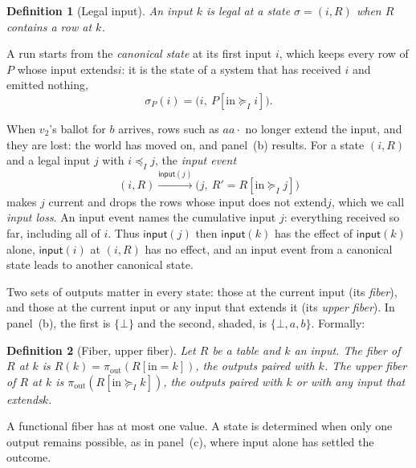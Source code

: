 \documentclass[sigconf]{cidr-2027}
\newtheorem{definition}{Definition}
\theoremstyle{remark}
\newcommand{\InputOrd}{\preceq_I}
\newcommand{\InputGe}{\succeq_I}
\newcommand{\inrel}{extends\xspace}          %
\newcommand{\inrelbase}{extend\xspace}       %
\begin{document}
\begin{definition}[Legal input]
\label{def:legal-input}
An input $k$ is \emph{legal} at a state $\sigma=(i,R)$ when $R$ contains a row at $k$.
\end{definition}

A run starts from the \emph{canonical state} at its first input $i$, which
keeps every row of $P$ whose input \inrel $i$: it is the state of a system that
has received $i$ and emitted nothing,
\begin{equation}
  \sigma_P(i)=\bigl(i,\ P[\mathrm{in}\InputGe i]\bigr).
  \label{eq:canonical-state}
\end{equation}

\textcolor{reviewed}{When $v_2$'s ballot for $b$ arrives, rows such as $aa\cdot$ no longer extend
the input, and they are lost: the world has moved on, and panel~(b) results.} For a state $(i,R)$ and a legal input $j$ with $i\InputOrd j$, the \emph{input
event}
\begin{equation}
  (i,R)\xrightarrow{\mathsf{input}(j)}
  \bigl(j,\ R' = R[\mathrm{in}\InputGe j]\bigr)
  \label{eq:input-event}
\end{equation}
makes $j$ current and drops the rows whose input does not \inrelbase $j$,
which we call \emph{input loss}. An input event names the cumulative input
$j$: everything received so far, including all of $i$. Thus
$\mathsf{input}(j)$ then $\mathsf{input}(k)$ has the effect of
$\mathsf{input}(k)$ alone, $\mathsf{input}(i)$ at $(i,R)$ has no effect, and an
input event from a canonical state leads to another canonical state.

\textcolor{reviewed}{Two sets of outputs matter in every state: those at the current
input (its \emph{fiber}), and those at the current input or any input that
\inrel it (its \emph{upper fiber}).} \textcolor{reviewed}{In panel~(b), the
first is $\{\bot\}$ and the second, shaded, is $\{\bot,a,b\}$.} Formally:

\begin{definition}[Fiber, upper fiber]
\label{def:fiber}
\textcolor{reviewed}{Let $R$ be a table and $k$ an input.} \textcolor{reviewed}{The \emph{fiber} of $R$ at $k$ is
$R(k)=\pi_{\mathrm{out}}(R[\mathrm{in}=k])$, the outputs paired with $k$.} \textcolor{reviewed}{The
\emph{upper fiber} of $R$ at $k$ is $\pi_{\mathrm{out}}(R[\mathrm{in}\InputGe
k])$, the outputs paired with $k$ or with any input that \inrel $k$.}
\end{definition}

A functional fiber has at most one value. \textcolor{reviewed}{A state is determined when only one
output remains possible, as in panel~(c), where input alone has settled the
outcome.}
\end{document}

